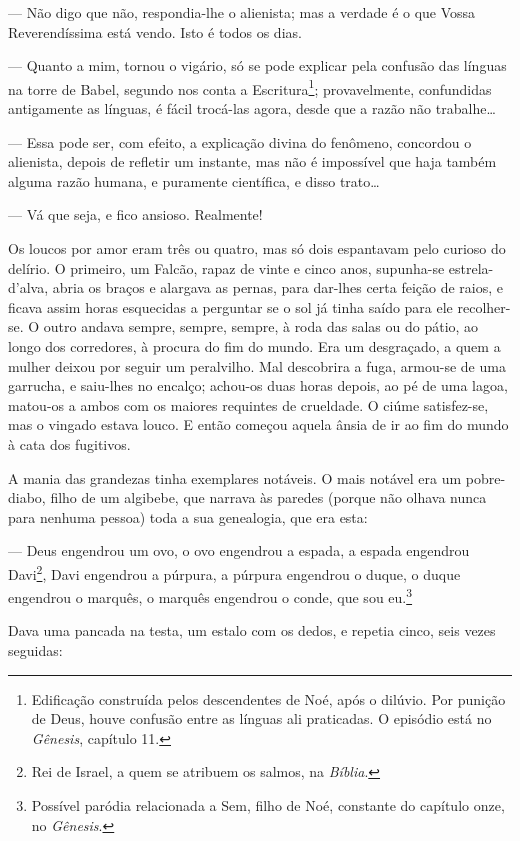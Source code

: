 --- Não digo que não, respondia-lhe o alienista; mas a verdade é o que
Vossa Reverendíssima está vendo. Isto é todos os dias.

--- Quanto a mim, tornou o vigário, só se pode explicar pela confusão
das línguas na torre de Babel, segundo nos conta a Escritura\footnote{Edificação
  construída pelos descendentes de Noé, após o dilúvio. Por punição de
  Deus, houve confusão entre as línguas ali praticadas. O episódio está
  no \emph{Gênesis}, capítulo 11.}; provavelmente, confundidas
antigamente as línguas, é fácil trocá-las agora, desde que a razão não
trabalhe\ldots{}

--- Essa pode ser, com efeito, a explicação divina do fenômeno,
concordou o alienista, depois de refletir um instante, mas não é
impossível que haja também alguma razão humana, e puramente científica,
e disso trato\ldots{}

--- Vá que seja, e fico ansioso. Realmente!

Os loucos por amor eram três ou quatro, mas só dois espantavam pelo
curioso do delírio. O primeiro, um Falcão, rapaz de vinte e cinco anos,
supunha-se estrela-d'alva, abria os braços e alargava as pernas, para
dar-lhes certa feição de raios, e ficava assim horas esquecidas a
perguntar se o sol já tinha saído para ele recolher-se. O outro andava
sempre, sempre, sempre, à roda das salas ou do pátio, ao longo dos
corredores, à procura do fim do mundo. Era um desgraçado, a quem a
mulher deixou por seguir um peralvilho. Mal descobrira a fuga, armou-se
de uma garrucha, e saiu-lhes no encalço; achou-os duas horas depois, ao
pé de uma lagoa, matou-os a ambos com os maiores requintes de crueldade.
O ciúme satisfez-se, mas o vingado estava louco. E então começou aquela
ânsia de ir ao fim do mundo à cata dos fugitivos.

A mania das grandezas tinha exemplares notáveis. O mais notável era um
pobre-diabo, filho de um algibebe, que narrava às paredes (porque não
olhava nunca para nenhuma pessoa) toda a sua genealogia, que era esta:

--- Deus engendrou um ovo, o ovo engendrou a espada, a espada engendrou
Davi\footnote{Rei de Israel, a quem se atribuem os salmos, na
  \emph{Bíblia}.}, Davi engendrou a púrpura, a púrpura engendrou o
duque, o duque engendrou o marquês, o marquês engendrou o conde, que sou
eu.\footnote{Possível paródia relacionada a Sem, filho de Noé, constante
  do capítulo onze, no \emph{Gênesis}.}

Dava uma pancada na testa, um estalo com os dedos, e repetia cinco, seis
vezes seguidas:

